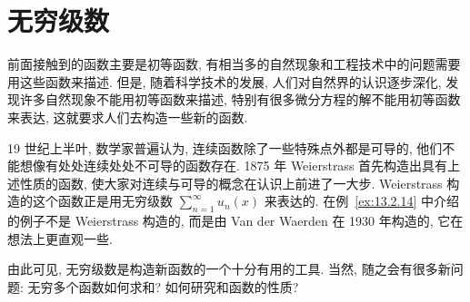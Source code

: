 
\chapter{无穷级数}\label{ch:12}

前面接触到的函数主要是初等函数, 有相当多的自然现象和工程技术中的问题需要用这些函数来描述. 但是, 随着科学技术的发展, 人们对自然界的认识逐步深化, 发现许多自然现象不能用初等函数来描述, 特别有很多微分方程的解不能用初等函数来表达, 这就要求人们去构造一些新的函数.

19 世纪上半叶, 数学家普遍认为, 连续函数除了一些特殊点外都是可导的, 他们不能想像有处处连续处处不可导的函数存在. 1875 年 Weierstrass 首先构造出具有上述性质的函数, 使大家对连续与可导的概念在认识上前进了一大步. Weierstrass 构造的这个函数正是用无穷级数 $\sum_{n=1}^{\infty}u_{n}(x)$ 来表达的. 在例~\ref{ex:13.2.14} 中介绍的例子不是 Weierstrass 构造的, 而是由 Van der Waerden 在 1930 年构造的, 它在想法上更直观一些.

由此可见, 无穷级数是构造新函数的一个十分有用的工具. 当然, 随之会有很多新问题: 无穷多个函数如何求和? 如何研究和函数的性质?







